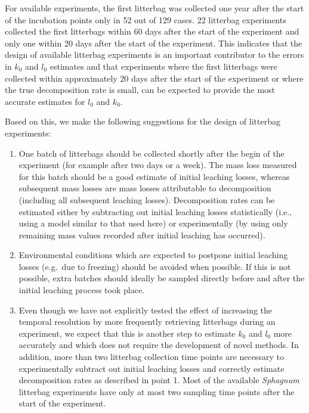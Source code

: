 \documentclass[bg, manuscript]{copernicus}
\begin{document}
For available experiments, the first litterbag was collected one year after the start of the incubation points only in 52 out of 129 cases. 22 litterbag experiments collected the first litterbags within 60 days after the start of the experiment and only one within 20 days after the start of the experiment. This indicates that the design of available litterbag experiments is an important contributor to the errors in \(k_0\) and \(l_0\) estimates and that experiments where the first litterbags were collected within approximately 20 days after the start of the experiment or where the true decomposition rate is small, can be expected to provide the most accurate estimates for \(l_0\) and \(k_0\).

Based on this, we make the following suggestions for the design of litterbag experiments:

\begin{enumerate}
\def\labelenumi{\arabic{enumi}.}
\item
  One batch of litterbags should be collected shortly after the begin of the experiment (for example after two days or a week). The mass loss measured for this batch should be a good estimate of initial leaching losses, whereas subsequent mass losses are mass losses attributable to decomposition (including all subsequent leaching losses). Decomposition rates can be estimated either by subtracting out initial leaching losses statistically (i.e., using a model similar to that used here) or experimentally (by using only remaining mass values recorded after initial leaching has occurred).
\item
  Environmental conditions which are expected to postpone initial leaching losses (e.g.~due to freezing) should be avoided when possible. If this is not possible, extra batches should ideally be sampled directly before and after the initial leaching process took place.
\item
  Even though we have not explicitly tested the effect of increasing the temporal resolution by more frequently retrieving litterbags during an experiment, we expect that this is another step to estimate \(k_0\) and \(l_0\) more accurately and which does not require the development of novel methods. In addition, more than two litterbag collection time points are necessary to experimentally subtract out initial leaching losses and correctly estimate decomposition rates as described in point 1. Most of the available \emph{Sphagnum} litterbag experiments have only at most two sampling time points after the start of the experiment.
\end{enumerate}
\end{document}
